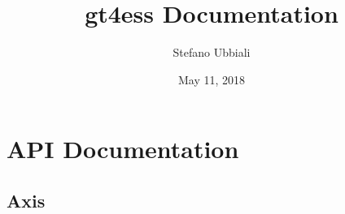 \documentclass[letterpaper,10pt,english]{sphinxmanual}
\title{gt4ess Documentation}
\date{May 11, 2018}
\author{Stefano Ubbiali}
\begin{document}
\maketitle
\sphinxtableofcontents
{}\label{\detokenize{index::doc}}



\chapter{API Documentation}
\label{\detokenize{api::doc}}\label{\detokenize{api:api-documentation}}\label{\detokenize{api:welcome-to-gt4ess-s-documentation}}

\section{Axis}
\label{\detokenize{api:axis}}
\end{document}
